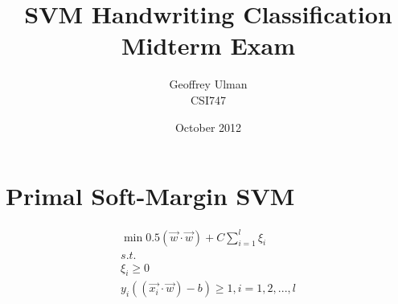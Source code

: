 \documentclass{article}
\begin{document}
\title{SVM Handwriting Classification\\
       Midterm Exam}
\author{Geoffrey Ulman\\
        CSI747}
\date{October 2012}
\maketitle

\section{Primal Soft-Margin SVM}\label{model1}

\begin{equation}\label{svm}
\begin{split}
\min 0.5\left( \vec{w} \cdot \vec{w} \right) + C \sum_{i=1}^l \xi_i \\
s.t. \\
\xi_i \ge 0 \\
y_i \left( \left( \vec{x_i} \cdot \vec{w} \right) - b \right) \ge 1 , i = 1,2,...,l
\end{split}
\end{equation}
\end{document}
